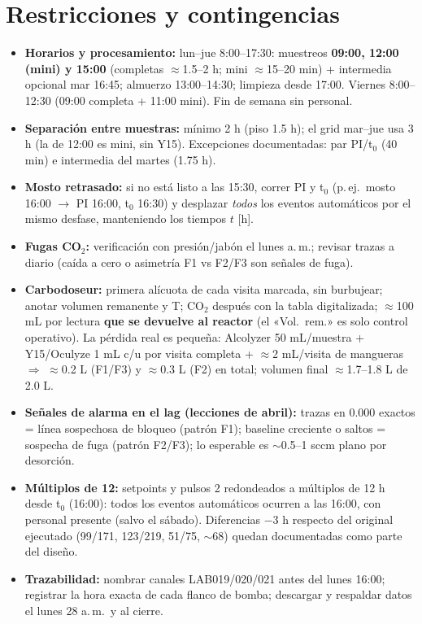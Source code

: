 \documentclass[10pt,landscape]{article}
\begin{document}
\section{Restricciones y contingencias}
\begin{itemize}\setlength{\itemsep}{1pt}
\item \textbf{Horarios y procesamiento:} lun--jue 8:00--17:30: muestreos \textbf{09:00, 12:00 (mini) y 15:00} (completas $\approx$1.5--2 h; mini $\approx$15--20 min) + intermedia opcional mar 16:45; almuerzo 13:00--14:30; limpieza desde 17:00. Viernes 8:00--12:30 (09:00 completa + 11:00 mini). Fin de semana sin personal.
\item \textbf{Separación entre muestras:} mínimo 2 h (piso 1.5 h); el grid mar--jue usa 3 h (la de 12:00 es mini, sin Y15). Excepciones documentadas: par PI/t$_0$ (40 min) e intermedia del martes (1.75 h).
\item \textbf{Mosto retrasado:} si no está listo a las 15:30, correr PI y t$_0$ (p.\,ej.\ mosto 16:00 $\rightarrow$ PI 16:00, t$_0$ 16:30) y desplazar \emph{todos} los eventos automáticos por el mismo desfase, manteniendo los tiempos $t$ [h].
\item \textbf{Fugas CO$_2$:} verificación con presión/jabón el lunes a.\,m.; revisar trazas a diario (caída a cero o asimetría F1 vs F2/F3 son señales de fuga).
\item \textbf{Carbodoseur:} primera alícuota de cada visita marcada, sin burbujear; anotar volumen remanente y T; CO$_2$ después con la tabla digitalizada; $\approx$100 mL por lectura \textbf{que se devuelve al reactor} (el «Vol.\ rem.» es solo control operativo). La pérdida real es pequeña: Alcolyzer 50 mL/muestra + Y15/Oculyze 1 mL c/u por visita completa + $\approx$2 mL/visita de mangueras $\Rightarrow$ $\approx$0.2 L (F1/F3) y $\approx$0.3 L (F2) en total; volumen final $\approx$1.7--1.8 L de 2.0 L.
\item \textbf{Señales de alarma en el lag (lecciones de abril):} trazas en 0.000 exactos = línea sospechosa de bloqueo (patrón F1); baseline creciente o saltos = sospecha de fuga (patrón F2/F3); lo esperable es $\sim$0.5--1 sccm plano por desorción.
\item \textbf{Múltiplos de 12:} setpoints y pulsos 2 redondeados a múltiplos de 12 h desde t$_0$ (16:00): todos los eventos automáticos ocurren a las 16:00, con personal presente (salvo el sábado). Diferencias $-3$ h respecto del original ejecutado (99/171, 123/219, 51/75, $\sim$68) quedan documentadas como parte del diseño.
\item \textbf{Trazabilidad:} nombrar canales LAB019/020/021 antes del lunes 16:00; registrar la hora exacta de cada flanco de bomba; descargar y respaldar datos el lunes 28 a.\,m.\ y al cierre.
\end{itemize}
\end{document}
